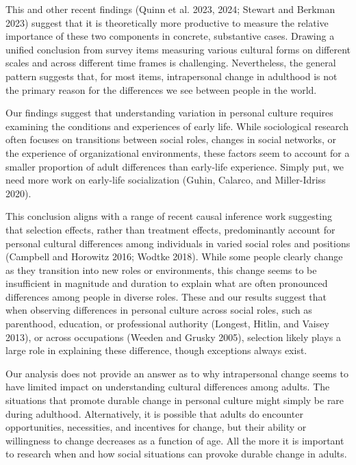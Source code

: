 \documentclass[
  11pt,
]{article}
\begin{document}
This and other recent findings (Quinn et al. 2023, 2024; Stewart and
Berkman 2023) suggest that it is theoretically more productive to
measure the relative importance of these two components in concrete,
substantive cases. Drawing a unified conclusion from survey items
measuring various cultural forms on different scales and across
different time frames is challenging. Nevertheless, the general pattern
suggests that, for most items, intrapersonal change in adulthood is not
the primary reason for the differences we see between people in the
world.

Our findings suggest that understanding variation in personal culture
requires examining the conditions and experiences of early life. While
sociological research often focuses on transitions between social roles,
changes in social networks, or the experience of organizational
environments, these factors seem to account for a smaller proportion of
adult differences than early-life experience. Simply put, we need more
work on early-life socialization (Guhin, Calarco, and Miller-Idriss
2020).

This conclusion aligns with a range of recent causal inference work
suggesting that selection effects, rather than treatment effects,
predominantly account for personal cultural differences among
individuals in varied social roles and positions (Campbell and Horowitz
2016; Wodtke 2018). While some people clearly change as they transition
into new roles or environments, this change seems to be insufficient in
magnitude and duration to explain what are often pronounced differences
among people in diverse roles. These and our results suggest that when
observing differences in personal culture across social roles, such as
parenthood, education, or professional authority (Longest, Hitlin, and
Vaisey 2013), or across occupations (Weeden and Grusky 2005), selection
likely plays a large role in explaining these difference, though
exceptions always exist.

Our analysis does not provide an answer as to why intrapersonal change
seems to have limited impact on understanding cultural differences among
adults. The situations that promote durable change in personal culture
might simply be rare during adulthood. Alternatively, it is possible
that adults do encounter opportunities, necessities, and incentives for
change, but their ability or willingness to change decreases as a
function of age. All the more it is important to research when and how
social situations can provoke durable change in adults.
\end{document}
